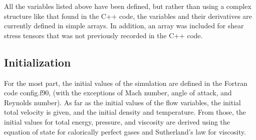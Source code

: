 \documentclass[12pt]{article}
\begin{document}
    All the variables listed above have been defined, but rather than using a complex structure like that found in the C++ code, the variables and their derivatives are currently defined in simple arrays. In addition, an array was included for shear stress tensors that was not previously recorded in the C++ code.

    \subsection{Initialization}
    For the most part, the initial values of the simulation are defined in the Fortran code config.f90, (with the exceptions of Mach number, angle of attack, and Reynolds number). As far as the initial values of the flow variables, the initial total velocity is given, and the initial density and temperature. From those, the initial values for total energy, pressure, and viscosity are derived using the equation of state for calorically perfect gases and Sutherland's law for viscosity.
\end{document}
